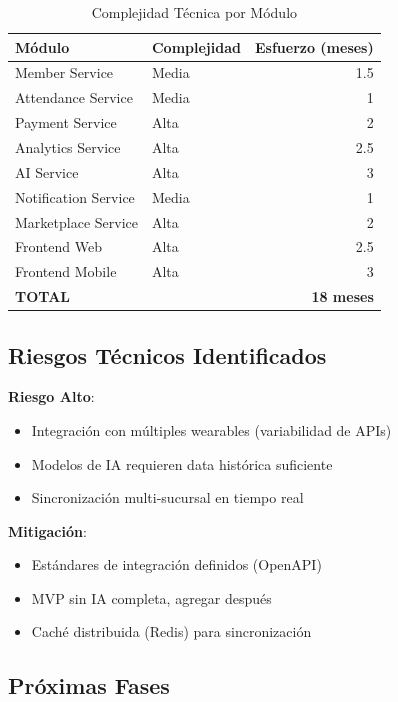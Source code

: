 \documentclass[11pt,a4paper]{article}
\begin{document}
\begin{itemize}
\begin{table}[H]
\centering
\caption{Complejidad Técnica por Módulo}
\begin{tabular}{|l|l|r|}
\hline
\textbf{Módulo} & \textbf{Complejidad} & \textbf{Esfuerzo (meses)} \\ \hline
Member Service & Media & 1.5 \\ \hline
Attendance Service & Media & 1 \\ \hline
Payment Service & Alta & 2 \\ \hline
Analytics Service & Alta & 2.5 \\ \hline
AI Service & Alta & 3 \\ \hline
Notification Service & Media & 1 \\ \hline
Marketplace Service & Alta & 2 \\ \hline
Frontend Web & Alta & 2.5 \\ \hline
Frontend Mobile & Alta & 3 \\ \hline
\hline
\textbf{TOTAL} & & \textbf{18 meses} \\ \hline
\end{tabular}
\end{table}

\subsection{Riesgos Técnicos Identificados}

\begin{alerta}
\textbf{Riesgo Alto}:
\begin{itemize}
    \item Integración con múltiples wearables (variabilidad de APIs)
    \item Modelos de IA requieren data histórica suficiente
    \item Sincronización multi-sucursal en tiempo real
\end{itemize}

\textbf{Mitigación}:
\begin{itemize}
    \item Estándares de integración definidos (OpenAPI)
    \item MVP sin IA completa, agregar después
    \item Caché distribuida (Redis) para sincronización
\end{itemize}
\end{alerta}

\subsection{Próximas Fases}


\end{itemize}
\end{document}
